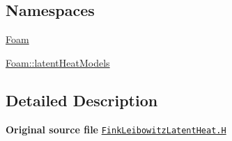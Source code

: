 \subsection*{Namespaces}
\begin{DoxyCompactItemize}
\item 
 \hyperlink{namespaceFoam}{Foam}
\item 
 \hyperlink{namespaceFoam_1_1latentHeatModels}{Foam\+::latent\+Heat\+Models}
\end{DoxyCompactItemize}


\subsection{Detailed Description}
{\bfseries Original source file} \href{../../../home/carlo/data/GeN-Foam/GeN-Foam_ffn/GeN-Foam/GeN-Foam/classes/thermalHydraulics/src/physicsModels/phaseChangeModels/latentHeatModels/FinkLeibowitz/FinkLeibowitzLatentHeat.H}{\tt Fink\+Leibowitz\+Latent\+Heat.\+H} 